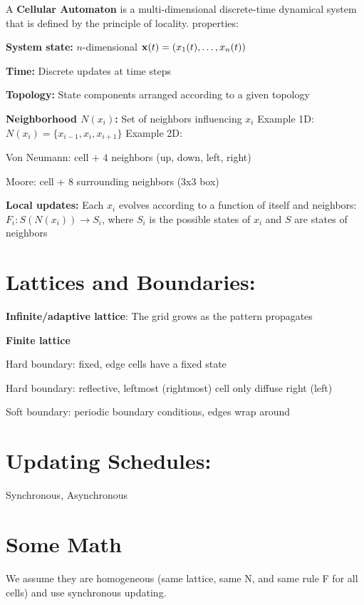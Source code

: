 A \textbf{Cellular Automaton} is a multi-dimensional discrete-time dynamical
system that is defined by
the principle of locality. properties:

\begin{tightitemize}
  \item \textbf{System state:} $n$-dimensional $\mathbf{x}(t) = (x_1(t), \dots, x_n(t))$
  \item \textbf{Time:} Discrete updates at time steps
  \item \textbf{Topology:} State components arranged according to a given topology
  \item \textbf{Neighborhood $N(x_i)$:} Set of neighbors influencing $x_i$  
        Example 1D: $N(x_i)=\{x_{i-1},x_i,x_{i+1}\}$  
        Example 2D:
        
        Von Neumann: cell + 4 neighbors (up, down, left, right)
        
        Moore: cell + 8 surrounding neighbors (3x3 box)
  \item \textbf{Local updates:} Each $x_i$ evolves according to a function of itself and neighbors:  
        $F_i: S(N(x_i)) \to S_i$, where $S_i$ is the possible states of $x_i$ and $S$ are states of neighbors
\end{tightitemize}


\section*{Lattices and Boundaries:}
\textbf{Infinite/adaptive lattice}: The grid grows as the pattern propagates

\textbf{Finite lattice}
\begin{tightitemize}
    \item Hard boundary: fixed, edge cells have a fixed state
    \item Hard boundary: reflective, leftmost (rightmost) cell only diffuse right (left)
    \item Soft boundary: periodic boundary conditions, edges wrap around
\end{tightitemize}

\section*{Updating Schedules:} Synchronous, Asynchronous

\section*{Some Math}
We assume they are homogeneous (same lattice, same N, and same rule F for all cells)
and use synchronous updating.

